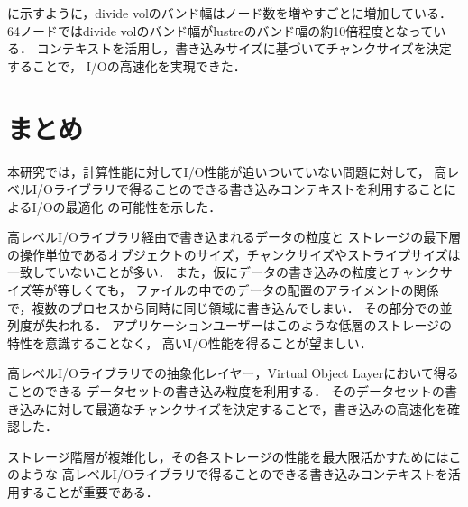 \documentclass[submit,techrep,noauthor]{ipsj}
\begin{document}
に示すように，divide volのバンド幅はノード数を増やすごとに増加している．
64ノードではdivide volのバンド幅がlustreのバンド幅の約10倍程度となっている．
コンテキストを活用し，書き込みサイズに基づいてチャンクサイズを決定することで，
I/Oの高速化を実現できた．

\section{まとめ}
本研究では，計算性能に対してI/O性能が追いついていない問題に対して，
高レベルI/Oライブラリで得ることのできる書き込みコンテキストを利用することによるI/Oの最適化
の可能性を示した．

高レベルI/Oライブラリ経由で書き込まれるデータの粒度と
ストレージの最下層の操作単位であるオブジェクトのサイズ，チャンクサイズやストライプサイズは一致していないことが多い．
また，仮にデータの書き込みの粒度とチャンクサイズ等が等しくても，
ファイルの中でのデータの配置のアライメントの関係で，複数のプロセスから同時に同じ領域に書き込んでしまい．
その部分での並列度が失われる．
アプリケーションユーザーはこのような低層のストレージの特性を意識することなく，
高いI/O性能を得ることが望ましい．

高レベルI/Oライブラリでの抽象化レイヤー，Virtual Object Layerにおいて得ることのできる
データセットの書き込み粒度を利用する．
そのデータセットの書き込みに対して最適なチャンクサイズを決定することで，書き込みの高速化を確認した．

ストレージ階層が複雑化し，その各ストレージの性能を最大限活かすためにはこのような
高レベルI/Oライブラリで得ることのできる書き込みコンテキストを活用することが重要である．



\end{document}
